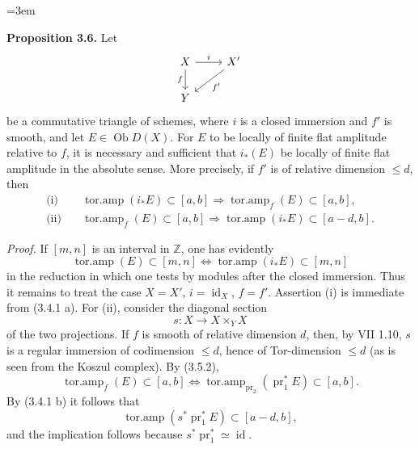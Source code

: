 \providecommand{\Ob}{\operatorname{Ob}}
\providecommand{\D}{\mathrm D}
\providecommand{\Ho}{\mathrm H}
\providecommand{\RHom}{\mathrm R\!\operatorname{Hom}}
\providecommand{\parfamp}{\operatorname{parf.amp}}
\providecommand{\tamp}{\operatorname{tor.amp}}
\providecommand{\Qcoh}{\operatorname{Qcoh}}
\providecommand{\Mod}{\operatorname{Mod}}
\providecommand{\Coh}{\operatorname{Coh}}
\providecommand{\Lib}{\operatorname{Lib}}
\providecommand{\Loclib}{\operatorname{Loclib}}
\providecommand{\qcoh}{\mathrm{qcoh}}
\providecommand{\coh}{\mathrm{coh}}
\providecommand{\parf}{\mathrm{parf}}
\providecommand{\torf}{\mathrm{torf}}
\providecommand{\id}{\operatorname{id}}
\providecommand{\Coker}{\operatorname{Coker}}
\providecommand{\rank}{\operatorname{rank}}
\providecommand{\rg}{\operatorname{rg}}
\providecommand{\Hom}{\operatorname{Hom}}
\providecommand{\Ext}{\operatorname{Ext}}
\providecommand{\Spec}{\operatorname{Spec}}
\providecommand{\Cone}{\operatorname{Cone}}
\providecommand{\pt}{\operatorname{Pt}}
\providecommand{\ind}{\operatorname{ind}}
\hfuzz=20pt
\emergencystretch=3em

\textbf{Proposition 3.6.} Let
\[
\begin{tikzcd}
X \arrow[r,"i"] \arrow[d,"f"'] & X' \arrow[dl,"f'"]\\
Y &
\end{tikzcd}
\]
be a commutative triangle of schemes, where \(i\) is a closed immersion and \(f'\) is smooth, and let \(E\in\Ob D(X)\). For \(E\) to be locally of finite flat amplitude relative to \(f\), it is necessary and sufficient that \(i_*(E)\) be locally of finite flat amplitude in the absolute sense. More precisely, if \(f'\) is of relative dimension \(\leq d\), then
\begin{align*}
\text{(i)}\quad &\tamp(i_*E)\subset[a,b] \Longrightarrow \tamp_f(E)\subset[a,b],\\
\text{(ii)}\quad &\tamp_f(E)\subset[a,b] \Longrightarrow \tamp(i_*E)\subset[a-d,b].
\end{align*}

\emph{Proof.} If \([m,n]\) is an interval in \(\mathbb Z\), one has evidently
\[
 \tamp(E)\subset[m,n] \Longleftrightarrow \tamp(i_*E)\subset[m,n]
\]
in the reduction in which one tests by modules after the closed immersion. Thus it remains to treat the case \(X=X'\), \(i=\id_X\), \(f=f'\). Assertion (i) is immediate from (3.4.1 a). For (ii), consider the diagonal section
\[
 s:X\longrightarrow X\times_YX
\]
of the two projections. If \(f\) is smooth of relative dimension \(d\), then, by VII 1.10, \(s\) is a regular immersion of codimension \(\leq d\), hence of Tor-dimension \(\leq d\) (as is seen from the Koszul complex). By (3.5.2),
\[
 \tamp_f(E)\subset[a,b]
 \Longleftrightarrow
 \tamp_{\operatorname{pr}_2}(\operatorname{pr}_1^*E)\subset[a,b].
\]
By (3.4.1 b) it follows that
\[
 \tamp(s^*\operatorname{pr}_1^*E)
 \subset[a-d,b],
\]
and the implication follows because \(s^*\operatorname{pr}_1^*\simeq\id\).

